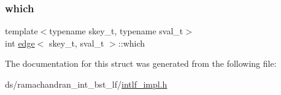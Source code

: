 \mbox{\label{structedge_a929c5d2b1d7044f230b39abbacfa5789}} 
\subsubsection{\texorpdfstring{which}{which}}
{\footnotesize\ttfamily template$<$typename skey\+\_\+t, typename sval\+\_\+t$>$ \\
int \hyperlink{structedge}{edge}$<$ skey\+\_\+t, sval\+\_\+t $>$\+::which}



The documentation for this struct was generated from the following file\+:\begin{DoxyCompactItemize}
\item 
ds/ramachandran\+\_\+int\+\_\+bst\+\_\+lf/\hyperlink{intlf__impl_8h}{intlf\+\_\+impl.\+h}\end{DoxyCompactItemize}
